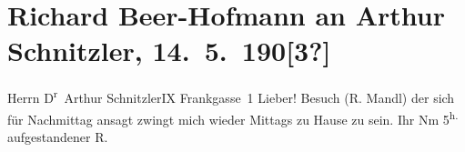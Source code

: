

         
         \renewcommand{\erwaehntePersonen}{Personen: Richard Beer-Hofmann, Richard Mandl}
         \renewcommand{\erwaehnteOrte}{Orte: Frankgasse 1, IX., Alsergrund, Wien, XV., Rudolfsheim-Fünfhaus}
         \renewcommand{\erwaehnteWerke}{}
               \section[Richard Beer-Hofmann an Arthur Schnitzler, 14. 5. 190{[}3?{]}]{ Richard Beer-Hofmann an Arthur Schnitzler, 14. 5. 190{[}3?{]}}\nopagebreak{}\rehead{ }\begin{ledgroupsized}[t]{13cm}\normalsize\beginnumbering \toendnotes[C]{\smallbreak\pagebreak[2]} 
\pstart{}{\pb}Herrn D\textsuperscript{r} Arthur Schnitzler\pend{}\pstart{}IX Frankgasse 1\pend{}{\bigskip}\pstart
           \noindent{}{\pb}Lieber! Besuch (R. Mandl) der
               sich für Nachmittag ansagt zwingt mich wieder Mittags zu
               Hause zu sein. Ihr\pend
           \pstart
           Nm 5\textsuperscript{h.} aufgestandener\pend
           \pstart \spacefill\mbox{R.}\pend{}
         
         \endnumbering{}\end{ledgroupsized}  \newcommand{\dateiname}{L01289}\newcommand{\titel}{Richard Beer-Hofmann an Arthur Schnitzler, 14. 5. 190[3?]}\newcommand{\editorInnen}{Martin Anton Müller und Gerd-Hermann Susen}
      